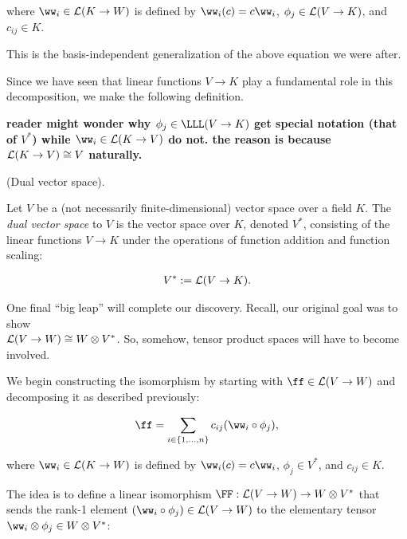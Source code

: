 where $\ww_i \in \LLLL(K \rightarrow W)$ is defined by $\ww_i(c) = c \ww_i$, $\phi_j \in \mathcal{L}(V \rightarrow K)$, and $c_{ij} \in K$.

This is the basis-independent generalization of the above equation we were after.

Since we have seen that linear functions $V \rightarrow K$ play a fundamental role in this decomposition, we make the following definition.

\textbf{reader might wonder why $\phi_j \in \LLL(V \rightarrow K)$ get special notation (that of $V^*$) while $\ww_i \in \LLLL(K \rightarrow V)$ do not. the reason is because $\mathcal{L}(K \rightarrow V) \cong V$ naturally.}

\begin{defn}
\label{ch::motivated_intro::defn::dual_space_1}
    (Dual vector space).
    
    Let $V$ be a (not necessarily finite-dimensional) vector space over a field $K$. The \textit{dual vector space} to $V$ is the vector space over $K$, denoted $V^*$, consisting of the linear functions $V \rightarrow K$ under the operations of function addition and function scaling:
    
    \begin{align*}
        V^* := \mathcal{L}(V \rightarrow K).
    \end{align*}
\end{defn}

\vspace{.5cm}

One final ``big leap'' will complete our discovery. Recall, our original goal was to show \\ ${\mathcal{L}(V \rightarrow W) \cong W \otimes V^*}$. So, somehow, tensor product spaces will have to become involved.

We begin constructing the isomorphism by starting with $\ff \in \LLLL(V \rightarrow W)$ and decomposing it as described previously:

\begin{align*}
    \ff = \sum_{\substack{i \in \{1, ..., n\}}} c_{ij} (\ww_i \circ \phi_j),
\end{align*}

where $\ww_i \in \LLLL(K \rightarrow W)$ is defined by $\ww_i(c) = c \ww_i$, $\phi_j \in V^*$, and $c_{ij} \in K$.

The idea is to define a linear isomorphism $\FF:\LLLL(V \rightarrow W) \rightarrow W \otimes V^*$ that sends the rank-1 element ${(\ww_i \circ \phi_j) \in \LLLL(V \rightarrow W)}$ to the elementary tensor $\ww_i \otimes \phi_j \in W \otimes V^*$:

